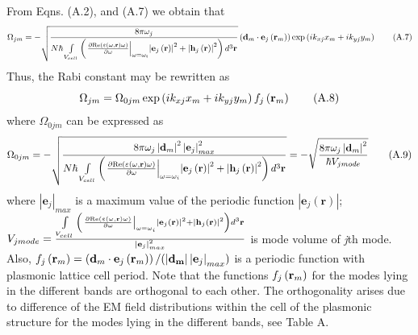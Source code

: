 \documentclass[aps,pra,amsmath,amssymb,onecolumn,superscriptaddress,showpacs,floatfix,]{revtex4-1}
\begin{document}
From Eqns. (A.2), and (A.7) we obtain that
\begin{equation}
{\Omega _{jm}} =-\sqrt{\frac{{8\pi \omega _j}}{{N \hbar} \int\limits_{{V_{cell}}} {\left( {{{\left. {\frac{{\partial {\mathop{\rm Re}\nolimits} \left( {\varepsilon(\omega, \textbf{r}) \omega } \right)}}{{\partial \omega }}} \right|}_{\omega  = {\omega _i}}}{{\left| {{{\bf{e}}_j}\left( {\bf{r}} \right)} \right|}^2} + {{\left| {{{\bf{h}}_j}\left( {\bf{r}} \right)} \right|}^2}} \right){d^3}{\bf{r}}}}} \left( {{{\bf{d}}_m} \cdot {{\bf{e}}_j}\left( {{{\bf{r}}_m}} \right)} \right)\exp \left( {i{k_{xj}}{x_m} + i{k_{yj}}{y_m}} \right) \tag{A.7}
\end{equation}
Thus, the Rabi constant may be rewritten as
\begin{equation}
{\Omega _{jm}} = {\Omega _{0jm}}\exp \left( {i{k_{xj}}{x_m} + i{k_{yj}}{y_m}} \right){f_j}\left( {{{\bf{r}}_m}} \right) \tag{A.8}
\end{equation}
where $\Omega _{0jm}$ can be expressed as
\begin{equation}
{\Omega _{0jm}} =-\sqrt{\frac{{8\pi \omega _j \left|\textbf{d}_m\right|^2 \left|\textbf{e}_{j}\right|_{max}^2}}{{N \hbar} \int\limits_{{V_{cell}}} {\left( {{{\left. {\frac{{\partial {\mathop{\rm Re}\nolimits} \left( {\varepsilon(\omega, \textbf{r}) \omega } \right)}}{{\partial \omega }}} \right|}_{\omega  = {\omega _i}}}{{\left| {{{\bf{e}}_j}\left( {\bf{r}} \right)} \right|}^2} + {{\left| {{{\bf{h}}_j}\left( {\bf{r}} \right)} \right|}^2}} \right){d^3}{\bf{r}}}}} = -\sqrt{\frac{{8\pi \omega _j \left|\textbf{d}_m\right|^2}}{\hbar V_{j mode}}} \tag{A.9}
\end{equation}
where $\left|\textbf{e}_{j}\right|_{max}$ is a maximum value of the periodic function $\left|\textbf{e}_{j}(\textbf{r})\right|$; $V_{j mode}=\frac{\int\limits_{{V_{cell}}} {\left( {{{\left. {\frac{{\partial {\mathop{\rm Re}\nolimits} \left( {\varepsilon(\omega, \textbf{r}) \omega } \right)}}{{\partial \omega }}} \right|}_{\omega  = {\omega _i}}}{{\left| {{{\bf{e}}_j}\left( {\bf{r}} \right)} \right|}^2} + {{\left| {{{\bf{h}}_j}\left( {\bf{r}} \right)} \right|}^2}} \right){d^3}{\bf{r}}}}{\left|\textbf{e}_{j}\right|_{max}^2}$ is mode volume of \textit{j}th mode.
Also, ${f_j}\left( {{{\bf{r}}_m}} \right) = \left( {{{\bf{d}}_m} \cdot {{\bf{e}}_j}\left( {{{\bf{r}}_m}} \right)} \right)/(\left|\bf{d}_m\right| \left|\textbf{e}_{j}\right|_{max})$ is a periodic function with plasmonic lattice cell period. Note that the functions ${f_j}\left( {{{\bf{r}}_m}} \right)$ for the modes lying in the different bands are orthogonal to each other. The orthogonality arises due to difference of the EM field distributions within the cell of the plasmonic structure for the modes lying in the different bands, see Table A.


\end{document}
